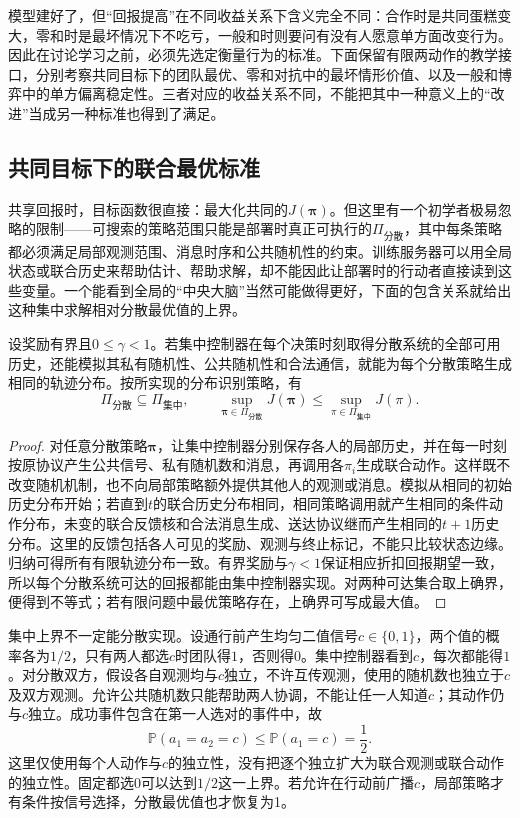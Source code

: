 模型建好了，但“回报提高”在不同收益关系下含义完全不同：合作时是共同蛋糕变大，零和时是最坏情况下不吃亏，一般和时则要问有没有人愿意单方面改变行为。因此在讨论学习之前，必须先选定衡量行为的标准。下面保留有限两动作的教学接口，分别考察共同目标下的团队最优、零和对抗中的最坏情形价值、以及一般和博弈中的单方偏离稳定性。三者对应的收益关系不同，不能把其中一种意义上的“改进”当成另一种标准也得到了满足。

\subsection{共同目标下的联合最优标准}
\label{sec:rl-multi-agent-team}

共享回报时，目标函数很直接：最大化共同的$J(\bm\pi)$。但这里有一个初学者极易忽略的限制——可搜索的策略范围只能是部署时真正可执行的$\Pi_{\text{分散}}$，其中每条策略都必须满足局部观测范围、消息时序和公共随机性的约束。训练服务器可以用全局状态或联合历史来帮助估计、帮助求解，却不能因此让部署时的行动者直接读到这些变量。一个能看到全局的“中央大脑”当然可能做得更好，下面的包含关系就给出这种集中求解相对分散最优值的上界。

\begin{theorem}[集中与分散策略的可行集合]
\label{thm:rl-multi-agent-inclusion}
设奖励有界且$0\leq\gamma<1$。若集中控制器在每个决策时刻取得分散系统的全部可用历史，还能模拟其私有随机性、公共随机性和合法通信，就能为每个分散策略生成相同的轨迹分布。按所实现的分布识别策略，有
\[
 \Pi_{\text{分散}}\subseteq\Pi_{\text{集中}},
 \qquad
 \sup_{\bm\pi\in\Pi_{\text{分散}}}J(\bm\pi)
 \leq
 \sup_{\pi\in\Pi_{\text{集中}}}J(\pi).
\]
\end{theorem}
\begin{proof}
对任意分散策略$\bm\pi$，让集中控制器分别保存各人的局部历史，并在每一时刻按原协议产生公共信号、私有随机数和消息，再调用各$\pi_i$生成联合动作。这样既不改变随机机制，也不向局部策略额外提供其他人的观测或消息。模拟从相同的初始历史分布开始；若直到$t$的联合历史分布相同，相同策略调用就产生相同的条件动作分布，未变的联合反馈核和合法消息生成、送达协议继而产生相同的$t+1$历史分布。这里的反馈包括各人可见的奖励、观测与终止标记，不能只比较状态边缘。归纳可得所有有限轨迹分布一致。有界奖励与$\gamma<1$保证相应折扣回报期望一致，所以每个分散系统可达的回报都能由集中控制器实现。对两种可达集合取上确界，便得到不等式；若有限问题中最优策略存在，上确界可写成最大值。
\end{proof}

集中上界不一定能分散实现。设通行前产生均匀二值信号$c\in\{0,1\}$，两个值的概率各为$1/2$，只有两人都选$c$时团队得$1$，否则得$0$。集中控制器看到$c$，每次都能得$1$。对分散双方，假设各自观测均与$c$独立，不许互传观测，使用的随机数也独立于$c$及双方观测。允许公共随机数只能帮助两人协调，不能让任一人知道$c$；其动作仍与$c$独立。成功事件包含在第一人选对的事件中，故
\[
 \mathbb P(a_1=a_2=c)\leq\mathbb P(a_1=c)=\frac12.
\]
这里仅使用每个人动作与$c$的独立性，没有把逐个独立扩大为联合观测或联合动作的独立性。固定都选0可以达到$1/2$这一上界。若允许在行动前广播$c$，局部策略才有条件按信号选择，分散最优值也才恢复为1。

